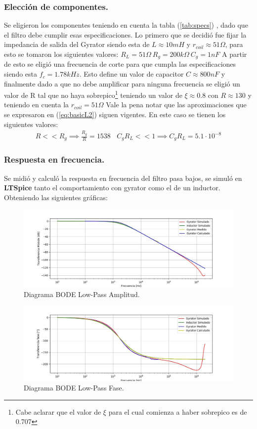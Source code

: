 \documentclass[a4paper]{article}
\begin{document}
\subsubsection{Elección de componentes.}
Se eligieron los componentes teniendo en cuenta la tabla (\ref{tab:specs}) , dado que el filtro debe cumplir esas especificaciones.
Lo primero que se decidió fue fijar la impedancia de salida del Gyrator siendo esta de $L \approx 10mH $ y $r_{coil} \approx 51\Omega $, para esto se tomaron los siguientes valores: $R_L = 51\Omega \ R_g = 200k\Omega \ C_g = 1nF$
A partir de esto se eligió una frecuencia de corte para que cumpla las especificaciones siendo esta  $f_c =1.78kHz $. Esto define un valor de capacitor $C \approx 800nF$ y finalmente dado a que no debe amplificar para ninguna frecuencia se eligió un valor de R tal que no haya sobrepico\footnote{Cabe aclarar que el valor de $\xi$ para el cual comienza a haber sobrepico es de 0.707} teniendo un valor de $\xi \approx 0.8 $ con $R \approx 130 $ y teniendo en cuenta la $r_{coil} = 51\Omega$  
Vale la pena notar que las aproximaciones que se expresaron en (\ref{eq:basicL2}) siguen vigentes. En este caso se tienen los siguientes valores:
\begin{align}  R<<R_g \implies  \frac{R_g}{R}=  1538 \ \ \ \ C_gR_L << 1 \implies C_gR_L =5.1\cdot 10^{-8} \end{align}


\subsubsection{Respuesta en frecuencia.}
Se midió y calculó la respuesta en frecuencia del filtro pasa bajos, se simuló en \textbf{LTSpice}  tanto el comportamiento con gyrator como el de un inductor. Obteniendo las siguientes gráficas:
\begin{figure}[H]	
	\centering
	\includegraphics[width=\textwidth]{ImagenesEj2/bodelp.jpg}
	\caption{Diagrama BODE Low-Pass Amplitud.}
	\label{fig:bodelp}
\end{figure}
\begin{figure}[H]	
	\centering
	\includegraphics[width=\textwidth]{ImagenesEj2/bodelpp.jpg}
	\caption{Diagrama BODE Low-Pass Fase.}
	\label{fig:bodelpp}
\end{figure}
\end{document}
